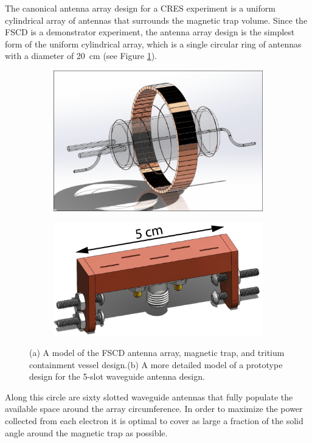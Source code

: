 The canonical antenna array design for a CRES experiment is a uniform cylindrical array of antennas that surrounds the magnetic trap volume. Since the FSCD is a demonstrator experiment, the antenna array design is the simplest form of the uniform cylindrical array, which is a single circular ring of antennas with a diameter of 20~cm (see Figure \ref{fig:chap3-fscd-render}).
\begin{figure}[htbp]
    \centering
    \begin{subfigure}{0.7\textwidth}
        \includegraphics*[width=\textwidth]{figs/Chapter-3/230614_fscd_render.png}
        \caption{}
    \end{subfigure}
    \hfill
    \begin{subfigure}{0.4\textwidth}
        \includegraphics*[width=\textwidth]{figs/Chapter-3/230614_5slot_model.png}
        \caption{}
    \end{subfigure}
    \caption{\label{fig:chap3-fscd-render} (a) A model of the FSCD antenna array, magnetic trap, and tritium containment vessel design.(b) A more detailed model of a prototype design for the 5-slot waveguide antenna design.}
\end{figure}
Along this circle are sixty slotted waveguide antennas that fully populate the available space around the array circumference. In order to maximize the power collected from each electron it is optimal to cover as large a fraction of the solid angle around the magnetic trap as possible. 

